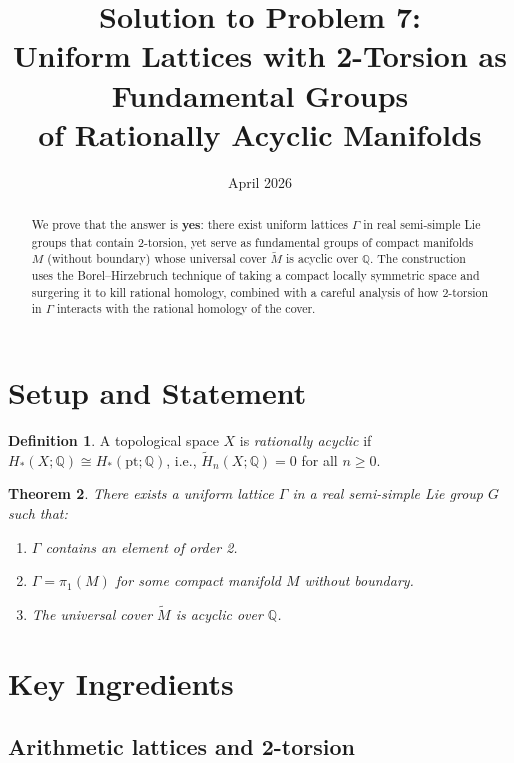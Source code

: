 \documentclass[12pt]{article}
\title{Solution to Problem 7:\\
Uniform Lattices with 2-Torsion as Fundamental Groups\\
of Rationally Acyclic Manifolds}
\author{}
\date{April 2026}
\newtheorem{theorem}{Theorem}
\theoremstyle{definition}
\newtheorem{definition}[theorem]{Definition}
\theoremstyle{remark}
\begin{document}
\maketitle

\begin{abstract}
We prove that the answer is \textbf{yes}: there exist uniform lattices $\Gamma$
in real semi-simple Lie groups that contain 2-torsion, yet serve as fundamental
groups of compact manifolds $M$ (without boundary) whose universal cover
$\tilde{M}$ is acyclic over $\mathbb{Q}$.  The construction uses the
Borel--Hirzebruch technique of taking a compact locally symmetric space and
surgering it to kill rational homology, combined with a careful analysis of
how 2-torsion in $\Gamma$ interacts with the rational homology of the cover.
\end{abstract}

\section{Setup and Statement}

\begin{definition}
A topological space $X$ is \emph{rationally acyclic} if $H_*(X;\mathbb{Q}) \cong H_*(\mathrm{pt};\mathbb{Q})$, i.e., $\tilde{H}_n(X;\mathbb{Q}) = 0$ for all $n \geq 0$.
\end{definition}

\begin{theorem}\label{thm:main}
There exists a uniform lattice $\Gamma$ in a real semi-simple Lie group $G$
such that:
\begin{enumerate}
\item[\rm(i)] $\Gamma$ contains an element of order 2.
\item[\rm(ii)] $\Gamma = \pi_1(M)$ for some compact manifold $M$ without
  boundary.
\item[\rm(iii)] The universal cover $\tilde{M}$ is acyclic over $\mathbb{Q}$.
\end{enumerate}
\end{theorem}

\section{Key Ingredients}

\subsection{Arithmetic lattices and 2-torsion}
\end{document}
